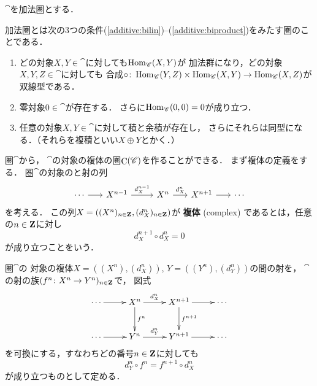 $\cat$を加法圏とする．
\begin{Attention*}
    加法圏とは次の3つの条件(\ref{additive:bilin})--(\ref{additive:biproduct})をみたす圏のことである．
    \begin{enumerate}
        \renewcommand{\labelenumi}{({\arabic{enumi}})}
        \item どの対象$X, Y\in\cat$に対しても$\mathop{\mathrm{Hom}}\nolimits_{\mathscr{C}}(X,Y)$が
        加法群になり，どの対象$X, Y, Z\in\cat$に対しても
        合成$\circ\colon\mathop{\mathrm{Hom}}\nolimits_{\mathscr{C}}(Y,Z)\times\mathop{\mathrm{Hom}}\nolimits_{\mathscr{C}}(X,Y)
        \to\mathop{\mathrm{Hom}}\nolimits_{\mathscr{C}}(X,Z)$が双線型である．\label{additive:bilin}
        \item 零対象$0\in\cat$が存在する．
        さらに$\mathop{\mathrm{Hom}}\nolimits_{\mathscr{C}}(0,0)=0$が成り立つ．\label{additive:zero}
        \item 任意の対象$X, Y\in\cat$に対して積と余積が存在し，
        さらにそれらは同型になる．（それらを複積といい$X\oplus Y$とかく．）\label{additive:biproduct}
    \end{enumerate}
\end{Attention*}
圏$\cat$から，
$\cat$の対象の複体の圏$\mathop{\mathrm{C}}\nolimits(\mathscr{C})$を作ることができる．
まず複体の定義をする．
圏$\cat$の対象のと射の列
\begin{equation}\label{eq:complex}
    \begin{tikzcd}[column sep=0.6cm]
        \cdots
        \arrow[r]
        &
        X^{n-1}
        \arrow[r,"d_X^{n-1}"] 
        &[+0.3cm]%
        X^n
        \arrow[r,"d_X^{n}"]
        &%
        X^{n+1}
        \arrow[r, ""] 
        &%
        \cdots
    \end{tikzcd}
\end{equation}
を考える．
この列$X=\left((X^n)_{n\in\mathbf{Z}},(d_X^{n})_{n\in\mathbf{Z}}\right)$が
\textbf{複体} (complex) であるとは，任意の$n\in\mathbf{Z}$に対し
\begin{equation}
    d_X^{n+1}\circ d_X^{n}=0
\end{equation}
が成り立つことをいう．

圏$\cat$の
対象の複体$X=((X^n),(d_X^{n}))$, $Y=((Y^n),(d_Y^{n}))$の間の射を，
$\cat$の射の族$(f^n\colon X^n\to Y^n)_{n\in\mathbf{Z}}$で，
図式
\begin{equation*}
    \vcenter{\xymatrix@C=26pt@R=26pt{
    \cdots \ar[r]
    & 
    X^{n}
    \ar[r]^-{d_X^n}
    \ar[d]^-{f^n}
    &
    X^{n+1}
    \ar[r]
    \ar[d]^-{f^{n+1}} 
    &\cdots
    \\
    \cdots \ar[r]
    & 
    Y^{n}
    \ar[r]^-{d_Y^n}
    &
    Y^{n+1}
    \ar[r]
    &\cdots
    }}
\end{equation*}
を可換にする，すなわちどの番号$n\in\mathbf{Z}$に対しても
\begin{equation}
    d_Y^n\circ f^n=f^{n+1}\circ d_X^n 
\end{equation}
が成り立つものとして定める．

